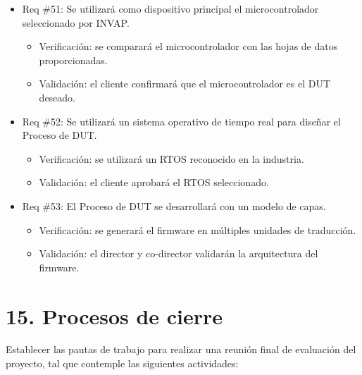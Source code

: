 \documentclass[
11pt, %
]{charter}
\begin{document}
\begin{itemize}
\item Req \#51: Se utilizará como dispositivo principal el microcontrolador seleccionado por INVAP.
\begin{itemize}
    \item Verificación: se comparará el microcontrolador con las hojas de datos proporcionadas.
    \item Validación: el cliente confirmará que el microcontrolador es el DUT deseado.
\end{itemize}

\item Req \#52: Se utilizará un sistema operativo de tiempo real para diseñar el Proceso de DUT.
\begin{itemize}
    \item Verificación: se utilizará un RTOS reconocido en la industria.
    \item Validación: el cliente aprobará el RTOS seleccionado.
\end{itemize}

\item Req \#53: El Proceso de DUT se desarrollará con un modelo de capas.
\begin{itemize}
    \item Verificación: se generará el firmware en múltiples unidades de traducción.
    \item Validación: el director y co-director validarán la arquitectura del firmware.
\end{itemize}

\end{itemize}

\section{15. Procesos de cierre}    
\label{sec:cierre}

Establecer las pautas de trabajo para realizar una reunión final de evaluación del proyecto, tal que contemple las siguientes actividades:
\end{document}
